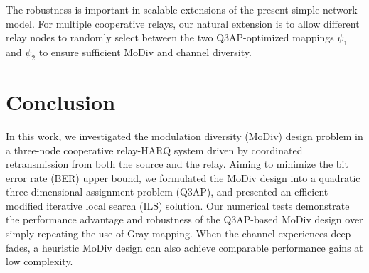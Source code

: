 \documentclass[journal,draftcls,onecolumn,12pt,twoside]{IEEEtran}
\begin{document}
The robustness is important in scalable extensions of the present simple network
model. For multiple cooperative relays, our natural extension is to allow
different relay nodes to randomly select between the two Q3AP-optimized mappings
$\psi_1$ and $\psi_2$ to ensure sufficient MoDiv and channel diversity. 

\section{Conclusion}
\label{sec:conclusion}
In this work, we investigated the modulation diversity (MoDiv) design problem in
a three-node cooperative relay-HARQ system driven by coordinated retransmission
from both the source and the relay. Aiming to minimize the bit error rate (BER)
upper bound, we formulated the MoDiv design into a quadratic three-dimensional
assignment problem (Q3AP), and presented an efficient modified iterative local
search (ILS) solution. Our numerical tests demonstrate the performance advantage
and robustness of the Q3AP-based MoDiv design over simply repeating the use of
Gray mapping. When the channel experiences deep fades, a heuristic MoDiv design
can also achieve comparable performance gains at low complexity.













%




\end{document}
